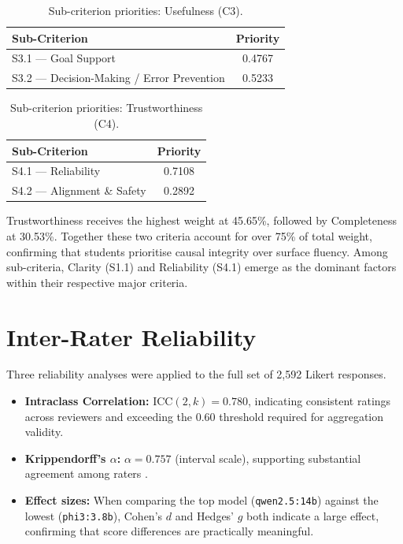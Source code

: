 \begin{table}[H]
  \centering
  \caption{Sub-criterion priorities: Usefulness (C3).}
  \label{tab:weights-sub3}
  \begin{tabular}{lc}
    \toprule
    Sub-Criterion & Priority \\
    \midrule
    S3.1 — Goal Support                       & 0.4767 \\
    S3.2 — Decision-Making / Error Prevention & 0.5233 \\
    \bottomrule
  \end{tabular}
\end{table}

\begin{table}[H]
  \centering
  \caption{Sub-criterion priorities: Trustworthiness (C4).}
  \label{tab:weights-sub4}
  \begin{tabular}{lc}
    \toprule
    Sub-Criterion & Priority \\
    \midrule
    S4.1 — Reliability         & 0.7108 \\
    S4.2 — Alignment \& Safety & 0.2892 \\
    \bottomrule
  \end{tabular}
\end{table}

Trustworthiness receives the highest weight at 45.65\%, followed by Completeness at
30.53\%. Together these two criteria account for over 75\% of total weight,
confirming that students prioritise causal integrity over surface fluency. Among
sub-criteria, Clarity (S1.1) and Reliability (S4.1) emerge as the dominant factors
within their respective major criteria.

\section{Inter-Rater Reliability}
\label{sec:res-reliability}

Three reliability analyses were applied to the full set of 2{,}592 Likert responses.

\begin{itemize}
  \item \textbf{Intraclass Correlation:} $\mathrm{ICC}(2,k) = 0.780$, indicating
    consistent ratings across reviewers and exceeding the 0.60 threshold required for
    aggregation validity.
  \item \textbf{Krippendorff's $\alpha$:} $\alpha = 0.757$ (interval scale),
    supporting substantial agreement among raters \citep{hayes2007answering}.
  \item \textbf{Effect sizes:} When comparing the top model (\texttt{qwen2.5:14b})
    against the lowest (\texttt{phi3:3.8b}), Cohen's $d$ and Hedges' $g$ both
    indicate a large effect, confirming that score differences are practically
    meaningful.
\end{itemize}

